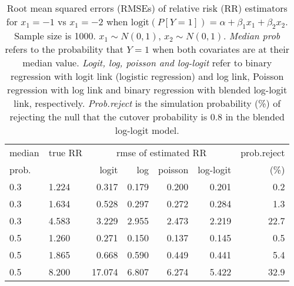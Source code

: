 \documentclass[12pt,a4paper]{article}
\begin{document}
\begin{table}[H] 
\small\sf\centering 
\caption{Root mean squared errors (RMSEs) of relative risk (RR) estimators for $x_1=-1$ vs $x_1=-2$ when $\mbox{logit}(P[Y=1])=\alpha+\beta_1 x_1 + \beta_2 x_2$. Sample size is 1000. $x_1 \sim $$N(0,1)$, $x_2 \sim N(0,1)$. {\it Median prob} refers to the probability that $Y=1$ when both covariates are at their median value. {\it Logit, log, poisson and log-logit} refer to binary regression with logit link (logistic regression) and log link, Poisson regression with log link and binary regression with blended log-logit link, respectively. {\it Prob.reject} is the simulation probability (\%) of rejecting the null that the cutover probability is $0.8$ in the blended log-logit model.} 
\begin{tabular}{llrrrrr} 
\toprule 
median & true RR & \multicolumn{4}{c}{rmse of estimated RR} & prob.reject \\ 
prob. & & logit & log & poisson & log-logit  & (\%) \\ \midrule 
0.3 & 1.224 &  0.317 & 0.179 & 0.200 & 0.201 &  0.2 \\  
0.3 & 1.634 &  0.528 & 0.297 & 0.272 & 0.284 &  1.3 \\  
0.3 & 4.583 &  3.229 & 2.955 & 2.473 & 2.219 & 22.7 \\  
0.5 & 1.260 &  0.271 & 0.150 & 0.137 & 0.145 &  0.5 \\  
0.5 & 1.865 &  0.668 & 0.590 & 0.449 & 0.441 &  5.4 \\  
0.5 & 8.200 & 17.074 & 6.807 & 6.274 & 5.422 & 32.9 \\  
\bottomrule 
\end{tabular} 
\end{table} 
\end{document}
